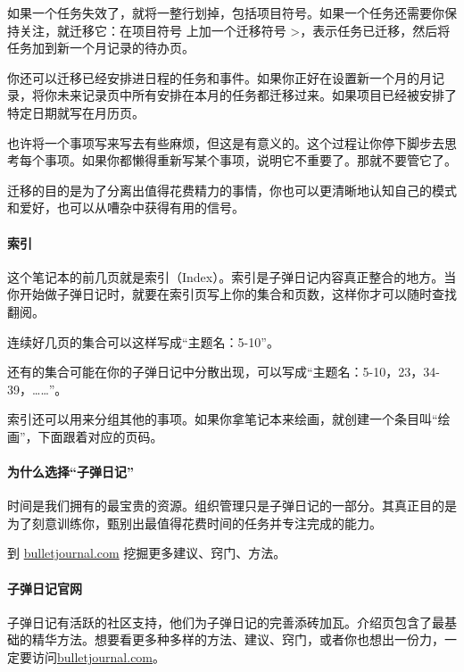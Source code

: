 \documentclass[a5paper]{article}
\begin{document}
如果一个任务失效了，就将一整行划掉，包括项目符号。如果一个任务还需要你保持关注，就迁移它：在项目符号 \textbullet 上加一个迁移符号 \textgreater，表示任务已迁移，然后将任务加到新一个月记录的待办页。

你还可以迁移已经安排进日程的任务和事件。如果你正好在设置新一个月的月记录，将你未来记录页中所有安排在本月的任务都迁移过来。如果项目已经被安排了特定日期就写在月历页。

也许将一个事项写来写去有些麻烦，但这是有意义的。这个过程让你停下脚步去思考每个事项。如果你都懒得重新写某个事项，说明它不重要了。那就不要管它了。

迁移的目的是为了分离出值得花费精力的事情，你也可以更清晰地认知自己的模式和爱好，也可以从嘈杂中获得有用的信号。

\clearpage

\paragraph{索引}

这个笔记本的前几页就是索引（Index）。索引是子弹日记内容真正整合的地方。当你开始做子弹日记时，就要在索引页写上你的集合和页数，这样你才可以随时查找翻阅。

连续好几页的集合可以这样写成“主题名：5-10”。

还有的集合可能在你的子弹日记中分散出现，可以写成“主题名：5-10，23，34-39，……”。

索引还可以用来分组其他的事项。如果你拿笔记本来绘画，就创建一个条目叫“绘画”，下面跟着对应的页码。

\paragraph{为什么选择“子弹日记”}

时间是我们拥有的最宝贵的资源。组织管理只是子弹日记的一部分。其真正目的是为了刻意训练你，甄别出最值得花费时间的任务并专注完成的能力。

到 \href{http://bulletjournal.com}{bulletjournal.com} 挖掘更多建议、窍门、方法。

\clearpage

\paragraph{子弹日记官网}

子弹日记有活跃的社区支持，他们为子弹日记的完善添砖加瓦。介绍页包含了最基础的精华方法。想要看更多种多样的方法、建议、窍门，或者你也想出一份力，一定要访问\href{http://bulletjournal.com}{bulletjournal.com}。
\end{document}
